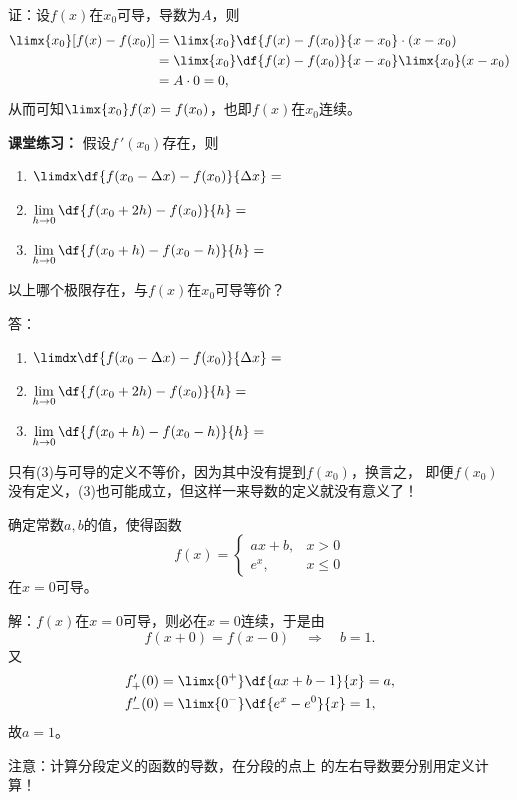 证：设$f(x)$在$x_0$可导，导数为$A$，则
\begin{align*}
	\limx{x_0}[f(x)-f(x_0)]
	&=\limx{x_0}\df{f(x)-f(x_0)}{x-x_0}\cdot(x-x_0)\\
	&=\limx{x_0}\df{f(x)-f(x_0)}{x-x_0}\limx{x_0}(x-x_0)\\
	&=A\cdot 0=0,
\end{align*}
从而可知$\limx{x_0}f(x)=f(x_0)$，也即$f(x)$在$x_0$连续。
\fin

\bs
{\bf 课堂练习：} 假设$f\,'(x_0)$存在，则
\begin{enumerate}[(1)]
  \setlength{\itemindent}{1cm}
  \item $\limdx\df{f(x_0-\Delta x)-f(x_0)}{\Delta
  x}=$ \underline{\quad\quad} 
  \item $\lim\limits_{h\to 0}\df{f(x_0+2h)-f(x_0)}{h}=$
   \underline{\quad\quad} 
  \item $\lim\limits_{h\to 0}\df{f(x_0+h)-f(x_0-h)}{h}=$ 
  \underline{\quad\quad}
\end{enumerate}
以上哪个极限存在，与$f(x)$在$x_0$可导等价？

\ifhint
答：
\begin{enumerate}[(1)]
  \setlength{\itemindent}{1cm}
  \item $\limdx\df{f(x_0-\Delta x)-f(x_0)}{\Delta
  x}=$ \underline{\quad} 
  \item $\lim\limits_{h\to 0}\df{f(x_0+2h)-f(x_0)}{h}=$
   \underline{\quad} 
  \item $\lim\limits_{h\to 0}\df{f(x_0+h)-f(x_0-h)}{h}=$ 
  \underline{\quad}
\end{enumerate}
只有(3)与可导的定义不等价，因为其中没有提到$f(x_0)$，换言之，
即便$f(x_0)$没有定义，(3)也可能成立，但这样一来导数的定义就没有意义了！
\fi

\bs
\egz 确定常数$a,b$的值，使得函数
$$f(x)=\left\{\begin{array}{ll}ax+b,& x>0\\
e^x,& x\leq 0\end{array}\right.$$
在$x=0$可导。

解：$f(x)$在$x=0$可导，则必在$x=0$连续，于是由
$$f(x+0)=f(x-0)\quad\Rightarrow\quad b=1.$$
又
\begin{align*}
	f'_+(0)&=\limx{0^+}\df{ax+b-1}{x}=a,\\
	f'_-(0)&=\limx{0^-}\df{e^x-e^0}{x}=1,
\end{align*}
故$a=1$。\fin

{\baa 注意：计算分段定义的函数的导数，在分段的点上
的左右导数要分别用定义计算！}

